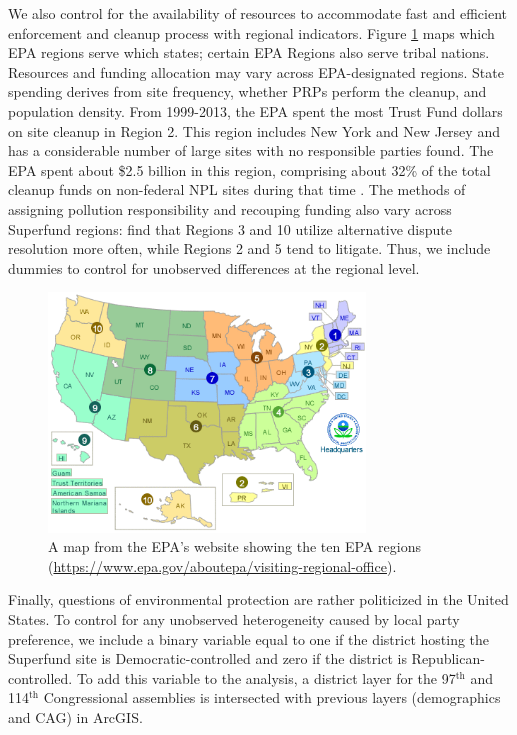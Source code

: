 \documentclass[12pt]{article}
\begin{document}
We also control for the availability of resources to accommodate fast and efficient enforcement and cleanup process with regional indicators. Figure \ref{map} maps which EPA regions serve which states; certain EPA Regions also serve tribal nations.
 Resources and funding allocation may vary across EPA-designated regions. State spending derives from site frequency, whether PRPs perform the cleanup, and population density. From 1999-2013, the EPA spent the most Trust Fund dollars on site cleanup in Region 2. This region includes New York and New Jersey and has a considerable number of large sites with no responsible parties found. The EPA spent about \$2.5 billion in this region, comprising about 32\% of the total cleanup funds on non-federal NPL sites during that time \parencite{GAO2015}. The methods of assigning pollution responsibility and recouping funding also vary across Superfund regions: \textcite{church2001cleaning} find that Regions 3 and 10 utilize alternative dispute resolution more often, while Regions 2 and 5 tend to litigate. Thus, we include dummies to control for unobserved differences at the regional level.
 
 \begin{figure}[H] \centering
\includegraphics[width=0.75\textwidth]{us-regions.png}
\caption{\small A map from the EPA's website showing the ten EPA regions (\underline{https://www.epa.gov/aboutepa/visiting-regional-office}). \label{map}}
\end{figure}

Finally, questions of environmental protection are rather politicized in the United States. To control for any unobserved heterogeneity caused by local party preference, we include a binary variable equal to one if the district hosting the Superfund site is Democratic-controlled and zero if the district is Republican-controlled. To add this variable to the analysis, a district layer for the 97$^\mathrm{th}$ and 114$^\mathrm{th}$ Congressional assemblies is intersected with previous layers (demographics and CAG) in ArcGIS.
\end{document}
